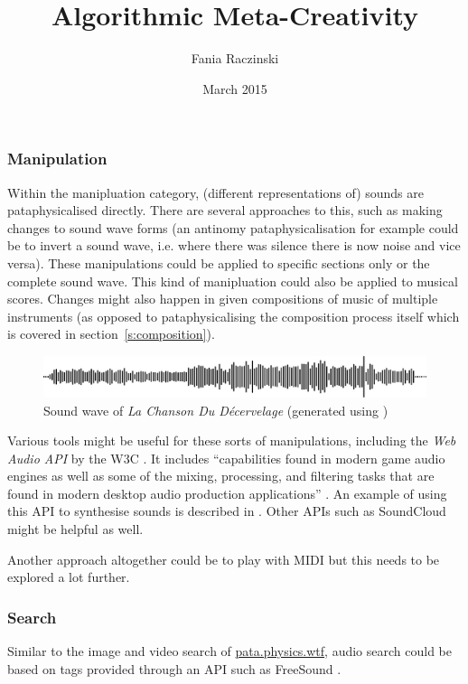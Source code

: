 \documentclass[11pt]{thesis} %
\title{Algorithmic Meta-Creativity}
\author{Fania Raczinski}
\date{March 2015}
\begin{document}
\subsubsection{Manipulation}

Within the manipluation category, (different representations of) sounds are pataphysicalised directly. There are several approaches to this, such as making changes to sound wave forms (an antinomy pataphysicalisation for example could be to invert a sound wave, i.e. where there was silence there is now noise and vice versa). These manipulations could be applied to specific sections only or the complete sound wave. This kind of manipluation could also be applied to musical scores. Changes might also happen in given compositions of music of multiple instruments (as opposed to pataphysicalising the composition process itself which is covered in section~\ref{s:composition}).

\begin{figure}[!htbp]
\centering
  \includegraphics[width=\linewidth]{simplewave.pdf}
\caption[Sound wave of \textit{La Chanson Du D{\'e}cervelage}]{Sound wave of \textit{La Chanson Du D{\'e}cervelage} \autocite[][Track 1]{UbuWebPata} (generated using \autocite{Heesakkersnd})}
\end{figure}

Various tools might be useful for these sorts of manipulations, including the \textit{Web Audio API} by the \ac{W3C} \autocite{Adenot2017}. It includes ``capabilities found in modern game audio engines as well as some of the mixing, processing, and filtering tasks that are found in modern desktop audio production applications'' \autocite*{Adenot2017}. An example of using this API to synthesise sounds is described in \autocite{Misuary2016}. Other \ac{API}s such as SoundCloud \autocite{soundcloud} might be helpful as well. 

Another approach altogether could be to play with \ac{MIDI} \autocite{midind} but this needs to be explored a lot further.


\subsubsection{Search}

Similar to the image and video search of \url{pata.physics.wtf}, audio search could be based on tags provided through an \ac{API} such as FreeSound \autocite{freesoundnd}. 
\end{document}
